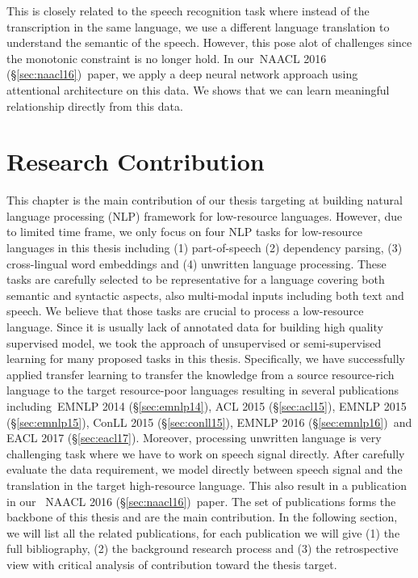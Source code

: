 \documentclass[12pt,twoside,final,hidelinks]{ltthesis}
\theoremstyle{definition}
\newcommand\emnlpiv{EMNLP 2014 (\S\ref{sec:emnlp14})}
\newcommand\conllv{ConLL 2015 (\S\ref{sec:conll15})}
\newcommand\aclv{ACL 2015 (\S\ref{sec:acl15})}
\newcommand\emnlpv{EMNLP 2015 (\S\ref{sec:emnlp15})}
\newcommand\naaclvi{NAACL 2016 (\S\ref{sec:naacl16})}
\newcommand\emnlpvi{EMNLP 2016 (\S\ref{sec:emnlp16})}
\newcommand\eaclvii{EACL 2017 (\S\ref{sec:eacl17})}
\begin{document}
This is closely related to the speech recognition task where instead of the transcription in the same language, we use a different language translation to understand the semantic of the speech. However, this pose alot of challenges since the monotonic constraint is no longer hold. In our~\naaclvi\ paper, we apply a deep neural network approach using attentional architecture on this data. We shows that we can learn meaningful relationship directly from this data.   


\chapter{Research Contribution}
\label{chap:research_summary}
This chapter is the main contribution of our thesis targeting at building natural language processing (NLP) framework for low-resource languages. 
However, due to limited time frame, we only focus on four NLP tasks 
for low-resource languages in this thesis including (1) part-of-speech  (2) dependency parsing, (3) cross-lingual word embeddings and (4) unwritten 
language processing. These tasks are carefully selected to be representative for a language covering both semantic and syntactic aspects, also 
multi-modal inputs including both text and speech. We believe that those tasks are crucial to process a low-resource language.  
Since it is usually lack of annotated data for building high quality supervised model, we took the approach of 
unsupervised or semi-supervised learning for many proposed tasks in this thesis. Specifically, we have successfully applied transfer learning 
to transfer the knowledge from a source resource-rich language to the target resource-poor languages resulting in several publications including~\emnlpiv, \aclv, 
\emnlpv, \conllv, \emnlpvi\ and \eaclvii . Moreover, processing unwritten language is very challenging task where we have to work on speech signal directly. After
carefully evaluate the data requirement, we model directly between speech signal and the translation in the target high-resource language. This also 
result in a publication in our ~\naaclvi\ paper.
The set of publications forms the backbone of this thesis and are the main contribution. 
In the following section, we will list all the related publications, for each publication we will give (1) the full bibliography, (2) the background research process and (3) the retrospective view with critical analysis of contribution toward the thesis target. 
\end{document}
